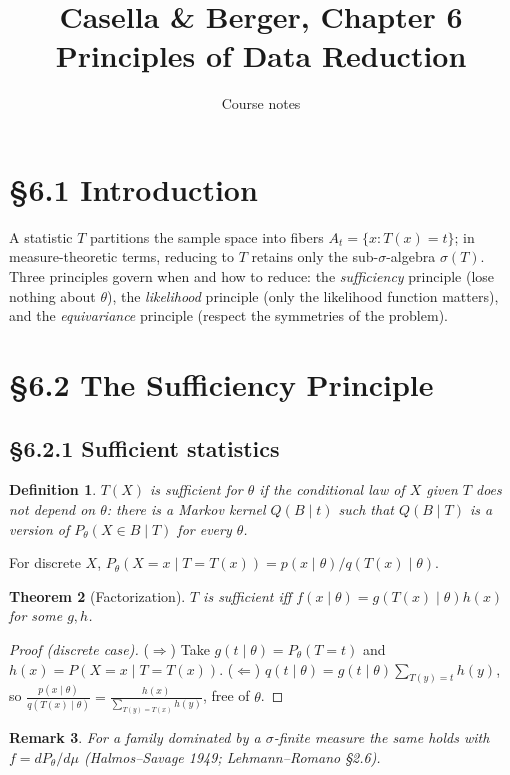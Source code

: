 \documentclass[11pt]{article}
\title{Casella \& Berger, Chapter 6\\[2pt]\large Principles of Data Reduction}
\author{Course notes}\date{}
\newtheorem{theorem}{Theorem}[section]
\newtheorem{definition}[theorem]{Definition}
\newtheorem{remark}[theorem]{Remark}
\begin{document}
\maketitle

\section{\S6.1 Introduction}
A statistic $T$ partitions the sample space into fibers $A_t=\{x:T(x)=t\}$; in measure-theoretic terms, reducing to $T$ retains only the sub-$\sigma$-algebra $\sigma(T)$. Three principles govern when and how to reduce: the \emph{sufficiency} principle (lose nothing about $\theta$), the \emph{likelihood} principle (only the likelihood function matters), and the \emph{equivariance} principle (respect the symmetries of the problem).

\section{\S6.2 The Sufficiency Principle}
\subsection{\S6.2.1 Sufficient statistics}
\begin{definition}
$T(X)$ is \emph{sufficient} for $\theta$ if the conditional law of $X$ given $T$ does not depend on $\theta$: there is a Markov kernel $Q(B\mid t)$ such that $Q(B\mid T)$ is a version of $P_\theta(X\in B\mid T)$ for every $\theta$.
\end{definition}
For discrete $X$, $P_\theta(X=x\mid T=T(x))=p(x\mid\theta)/q(T(x)\mid\theta)$.
\begin{theorem}[Factorization]
$T$ is sufficient iff $f(x\mid\theta)=g(T(x)\mid\theta)h(x)$ for some $g,h$.
\end{theorem}
\begin{proof}[Proof (discrete case)]
($\Rightarrow$) Take $g(t\mid\theta)=P_\theta(T=t)$ and $h(x)=P(X=x\mid T=T(x))$. ($\Leftarrow$) $q(t\mid\theta)=g(t\mid\theta)\sum_{T(y)=t}h(y)$, so $\frac{p(x\mid\theta)}{q(T(x)\mid\theta)}=\frac{h(x)}{\sum_{T(y)=T(x)}h(y)}$, free of $\theta$.
\end{proof}
\begin{remark}
For a family dominated by a $\sigma$-finite measure the same holds with $f=dP_\theta/d\mu$ (Halmos--Savage 1949; Lehmann--Romano \S2.6).
\end{remark}
\end{document}
